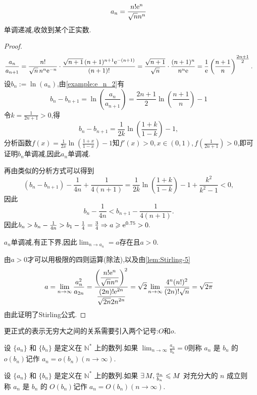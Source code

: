 \begin{lemma}
    $$a_n = \frac{n! \mathrm{e}^n}{\sqrt n n^n}$$单调递减,收敛到某个正实数.
\end{lemma}

\begin{proof}
    \[
        \frac{a_n}{a_{n+1}}
        = \frac{n!}{\sqrt{n}\,n^n \mathrm{e}^{-n}}
        \cdot \frac{\sqrt{n+1}\,(n+1)^{n+1}\mathrm{e}^{-(n+1)}}{(n+1)!}
        = \frac{\sqrt{n+1}}{\sqrt{n}}
        \cdot \frac{(n+1)^n}{n^n \mathrm{e}}
        = \frac{1}{\mathrm{e}}\left(\frac{n+1}{n}\right)^{\tfrac{2n+1}{2}}.
    \]
    设\(b_n := \ln(a_n)\),由\autoref{example:e_n_2}有
    \[
        b_n - b_{n+1}
        = \ln\!\left(\frac{a_n}{a_{n+1}}\right)
        = \frac{2n+1}{2}\ln\!\left(\frac{n+1}{n}\right) - 1
    \]
    令$k=\frac{1}{2n+1} > 0$,得$$b_n -b_{n+1} = \frac{1}{2k} \ln \left( \frac{1+k}{1-k} \right) -1, $$分析函数$f(x) = \frac{1}{2x} \ln \left( \frac{1+x}{1-x} \right) -1$知$f'(x) > 0, x \in (0,1), f\left( \frac{1}{2n+1} \right) > 0$,即可证明$b_n$单调减,因此$a_n$单调减.

    再由类似的分析方式可以得到$$(b_n -b_{n+1}) - \frac{1}{4n} + \frac{1}{4(n+1)} = \frac{1}{2k} \ln \left( \frac{1+k}{1-k} \right) -1 + \frac{k^2}{k^2-1} < 0, $$因此
    $$b_n - \frac{1}{4n} < b_{n+1} - \frac{1}{4(n+1)}.$$
    因此$b_n > b_n - \frac{1}{4n} > b_1 - \frac{1}{4} = \frac{3}{4} \Rightarrow a \geqslant \mathrm{e}^{0.75} > 0.$

    $a_n$单调减,有正下界,因此$\lim_{n \to a_n} = a$存在且$a > 0$.

    由$a > 0$才可以用极限的四则运算(除法),以及由\autoref{lem:Stirling-5}
    \begin{align*}
        a = \lim_{n \to \infty} \frac{a_n^2}{a_{2n}} =
        \frac{\displaystyle  \left(\frac{n! \mathrm{e}^n}{\sqrt n n^n}\right)^2}{\displaystyle  \frac{(2n)! \mathrm{e}^{2n}}{\sqrt{2n} {2n}^{2n}}}
        = \sqrt{2} \lim_{n \to \infty} \frac{4^n (n!)^2}{(2n)! \sqrt{n}} = \sqrt{2 \pi}
    \end{align*}
    由此证明了Stirling公式.
\end{proof}

更正式的表示无穷大之间的关系需要引入两个记号:$O$和$o$.

\begin{definition}
    设 $\{a_n\}$ 和 $\{b_n\}$ 是定义在 $\mathbb{N}^*$ 上的数列.如果 $\lim_{n \to \infty} \frac{a_n}{b_n} = 0$则称 $a_n$ 是 $b_n$ 的 $o(b_n)$记作 $a_n = o(b_n) (n \to \infty)$.

    设 $\{a_n\}$ 和 $\{b_n\}$ 是定义在 $\mathbb{N}^*$ 上的数列.如果 $\exists M, \frac{a_n}{b_n} \les M$ 对充分大的 $n$ 成立则称 $a_n$ 是 $b_n$ 的 $O(b_n)$记作 $a_n = O(b_n) (n \to \infty)$.
\end{definition}

